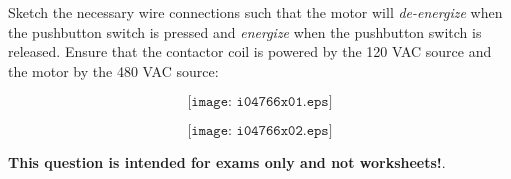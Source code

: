 

Sketch the necessary wire connections such that the motor will {\it de-energize} when the pushbutton switch is pressed and {\it energize} when the pushbutton switch is released.  Ensure that the contactor coil is powered by the 120 VAC source and the motor by the 480 VAC source:

$$\texttt{[image: i04766x01.eps]}$$







$$\texttt{[image: i04766x02.eps]}$$







{\bf This question is intended for exams only and not worksheets!}.



